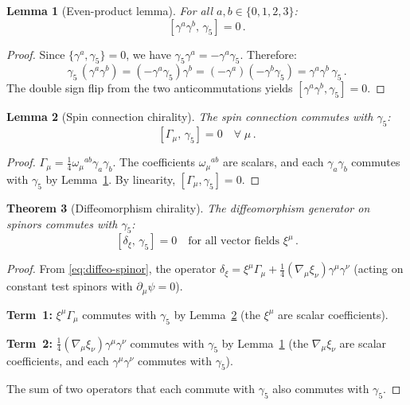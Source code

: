 \documentclass[11pt,a4paper]{article}
\newtheorem{theorem}{Theorem}[section]
\newtheorem{lemma}[theorem]{Lemma}
\begin{document}
\begin{lemma}[Even-product lemma]\label{lem:even}
For all $a, b \in \{0,1,2,3\}$:
\begin{equation}\label{eq:even-product}
  [\gamma^a\gamma^b,\, \gamma_5] = 0 \,.
\end{equation}
\end{lemma}

\begin{proof}
Since $\{\gamma^a, \gamma_5\} = 0$, we have
$\gamma_5\gamma^a = -\gamma^a\gamma_5$.  Therefore:
\begin{equation}
  \gamma_5\,(\gamma^a\gamma^b)
  = (-\gamma^a\gamma_5)\gamma^b
  = (-\gamma^a)(-\gamma^b\gamma_5)
  = \gamma^a\gamma^b\,\gamma_5 \,.
\end{equation}
The double sign flip from the two anticommutations yields
$[\gamma^a\gamma^b, \gamma_5] = 0$.
\end{proof}

\begin{lemma}[Spin connection chirality]\label{lem:spin-conn}
The spin connection commutes with $\gamma_5$:
\begin{equation}\label{eq:spin-conn-chiral}
  [\Gamma_\mu,\, \gamma_5] = 0 \quad \forall\;\mu \,.
\end{equation}
\end{lemma}

\begin{proof}
$\Gamma_\mu = \frac{1}{4}\omega_\mu{}^{ab}\gamma_a\gamma_b$.
The coefficients $\omega_\mu{}^{ab}$ are scalars, and each
$\gamma_a\gamma_b$ commutes with $\gamma_5$ by Lemma~\ref{lem:even}.
By linearity, $[\Gamma_\mu, \gamma_5] = 0$.
\end{proof}

\begin{theorem}[Diffeomorphism chirality]\label{thm:diffeo}
The diffeomorphism generator on spinors commutes with $\gamma_5$:
\begin{equation}\label{eq:diffeo-chiral}
  [\delta_\xi,\, \gamma_5] = 0 \quad
  \text{for all vector fields } \xi^\mu \,.
\end{equation}
\end{theorem}

\begin{proof}
From \eqref{eq:diffeo-spinor}, the operator
$\delta_\xi = \xi^\mu\Gamma_\mu
+ \frac{1}{4}(\nabla_\mu\xi_\nu)\gamma^\mu\gamma^\nu$
(acting on constant test spinors with $\partial_\mu\psi = 0$).

\textbf{Term~1:} $\xi^\mu\Gamma_\mu$ commutes with $\gamma_5$ by
Lemma~\ref{lem:spin-conn} (the $\xi^\mu$ are scalar coefficients).

\textbf{Term~2:} $\frac{1}{4}(\nabla_\mu\xi_\nu)\gamma^\mu\gamma^\nu$
commutes with $\gamma_5$ by Lemma~\ref{lem:even} (the
$\nabla_\mu\xi_\nu$ are scalar coefficients, and each
$\gamma^\mu\gamma^\nu$ commutes with $\gamma_5$).

The sum of two operators that each commute with $\gamma_5$ also
commutes with $\gamma_5$.
\end{proof}
\end{document}
